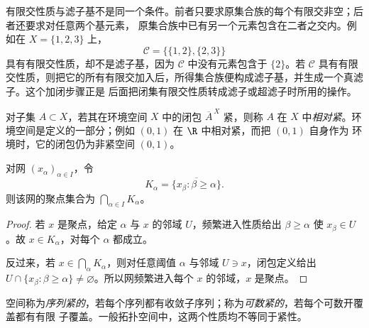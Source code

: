 有限交性质与滤子基不是同一个条件。前者只要求原集合族的每个有限交非空；后者还要求对任意两个基元素，
原集合族中已有另一个元素包含在二者之交内。例如在 \(X=\{1,2,3\}\) 上，
\[
  \mathcal C=\bigl\{\{1,2\},\{2,3\}\bigr\}
\]
具有有限交性质，却不是滤子基，因为 \(\mathcal C\) 中没有元素包含于 \(\{2\}\)。若 \(\mathcal C\)
具有有限交性质，则把它的所有有限交加入后，所得集合族便构成滤子基，并生成一个真滤子。这个加闭步骤正是
后面把闭集有限交性质转成滤子或超滤子时所用的操作。

\begin{definition}[相对紧]\label{def:1-2-1-relative-compact}
对子集 \(A\subset X\)，若其在环境空间 \(X\) 中的闭包 \(\overline A^{\,X}\) 紧，则称 \(A\) 在 \(X\)
中\emph{相对紧}。环境空间是定义的一部分；例如 \((0,1)\) 在 \(\R\) 中相对紧，而把 \((0,1)\) 自身作为
环境时，它的闭包仍为非紧空间 \((0,1)\)。
\end{definition}

\begin{proposition}[聚点的尾闭包表示]\label{proposition:1-2-1-tail-closure}
对网 \((x_\alpha)_{\alpha\in I}\)，令
\[
 K_\alpha=\overline{\{x_\beta:\beta\ge\alpha\}}.
\]
则该网的聚点集合为 \(\bigcap_{\alpha\in I}K_\alpha\)。
\end{proposition}
\begin{proof}
若 \(x\) 是聚点，给定 \(\alpha\) 与 \(x\) 的邻域 \(U\)，频繁进入性质给出
\(\beta\ge\alpha\) 使 \(x_\beta\in U\)。故 \(x\in K_\alpha\)，对每个 \(\alpha\) 都成立。

反过来，若 \(x\in\bigcap_\alpha K_\alpha\)，则对任意阈值 \(\alpha\) 与邻域 \(U\ni x\)，闭包定义给出
\(U\cap\{x_\beta:\beta\ge\alpha\}\ne\varnothing\)。所以网频繁进入每个 \(x\) 的邻域，\(x\) 是聚点。
\end{proof}

\begin{definition}[序列紧与可数紧]\label{def:1-2-1-3}
空间称为\emph{序列紧的}，若每个序列都有收敛子序列；称为\emph{可数紧的}，若每个可数开覆盖都有有限
子覆盖。一般拓扑空间中，这两个性质均不等同于紧性。
\end{definition}

